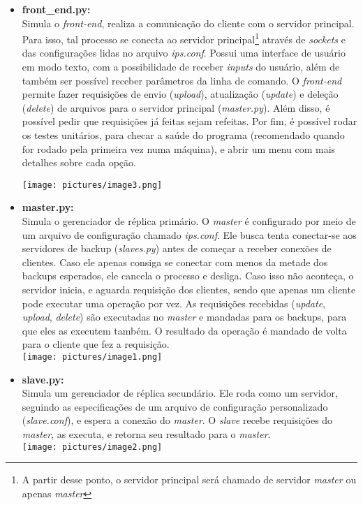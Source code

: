 \documentclass[12pt,a4paper]{article}
\begin{document}
		\begin{itemize}
			\item \textbf{front\_end.py:}\\Simula o \textit{front-end}, realiza a comunicação do cliente com o servidor principal. Para isso, tal processo se conecta ao servidor principal\footnote{A partir desse ponto, o servidor principal será chamado de servidor \textit{master} ou apenas \textit{master}} através de \textit{sockets} e das configurações lidas no arquivo \textit{ips.conf}. Possui uma interface de usuário em modo texto, com a possibilidade de receber \textit{inputs} do usuário, além de também ser possível receber parâmetros da linha de comando. O \textit{front-end} permite fazer requisições de envio (\textit{upload}), atualização (\textit{update}) e deleção (\textit{delete}) de arquivos para o servidor principal (\textit{master.py}). Além disso, é possível pedir que requisições já feitas sejam refeitas. Por fim, é possível rodar os testes unitários, para checar a saúde do programa (recomendado quando for rodado pela primeira vez numa máquina), e abrir um menu com mais detalhes sobre cada opção.
				
				\texttt{[image: pictures/image3.png]}
			
			\item \textbf{master.py:}\\Simula o gerenciador de réplica primário. O \textit{master} é configurado por meio de um arquivo de configuração chamado \textit{ips.conf}. Ele busca tenta conectar-se aos servidores de backup (\textit{slaves.py}) antes de começar a receber conexões de clientes. Caso ele apenas consiga se conectar com menos da metade dos backups esperados, ele cancela o processo e desliga. Caso isso não aconteça, o servidor inicia, e aguarda requisição dos clientes, sendo que apenas um cliente pode executar uma operação por vez. As requisições recebidas (\textit{update}, \textit{upload}, \textit{delete}) são executadas no \textit{master} e mandadas para os backups, para que eles as executem também. O resultado da operação é mandado de volta para o cliente que fez a requisição.\\
				\texttt{[image: pictures/image1.png]}
				
			\item \textbf{slave.py:}\\Simula um gerenciador de réplica secundário. Ele roda como um servidor, seguindo as especificações de um arquivo de configuração personalizado (\textit{slave.conf}), e espera a conexão do \textit{master}. O \textit{slave} recebe requisições do \textit{master}, as executa, e retorna seu resultado para o \textit{master}.\\
				\texttt{[image: pictures/image2.png]}
		\end{itemize}
	
\end{document}
